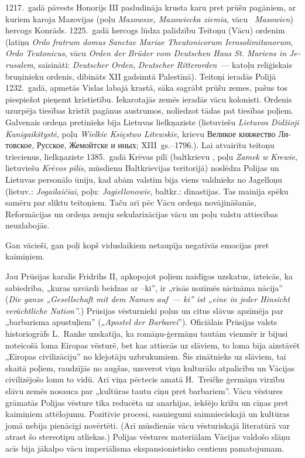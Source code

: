 \documentclass[twoside,a5paper,12pt,fleqn,openany]{extbook}
\newcommand{\pltxti}[1]{\textit{\textpolish{#1}}}
\newcommand{\rutxti}[1]{\textrussian{#1}}
\newcommand{\detxti}[1]{\textit{\textgerman{#1}}}
\newcommand{\lttxti}[1]{\textit{\textlithuanian{#1}}}
\newcommand{\latxti}[1]{\textit{\textlatin{#1}}}
\newcommand{\betxti}[1]{\textbelarusian{#1}}
\begin{document}
1217.~gadā pāvests Honorijs III pasludināja krusta karu pret prūšu pagāniem, ar kuriem karoja Mazovijas (poļu \pltxti{Mazowsze, Mazowiecka ziemia}, vācu ~\detxti{Masowien}) hercogs Konrāds. 1225.~gadā hercogs lūdza palīdzību Teitoņu (Vācu) ordenim (latīņu \latxti{Ordo fratrum domus Sanctae Mariae Theutonicorum Ierosolimitanorum}, \latxti{Ordo Teutonicus}, vācu \detxti{Orden der Brüder vom Deutschen Haus St. Mariens in Jerusalem}, saīsināti: \detxti{Deutscher Orden}, \detxti{Deutscher Ritterorden}~--- katoļu reliģiskais bruņinieku ordenis, dibināts XII gadsimtā Palestīnā). Teitoņi ieradās Polijā 1232.~gadā, apmetās Vislas labajā krastā, sāka sagrābt prūšu zemes, pašus tos piespiežot pieņemt kristietību. Iekarotajās zemēs ieradās vācu kolonisti. Ordenis uzurpēja tiesības kristīt pagānus austrumos, noliedzot tādas pat tiesības poļiem. Galvenais ordeņa pretinieks bija Lietuvas lielkņaziste (lietuviešu \lttxti{Lietuvos Didžioji Kunigaikštystė}, poļu \pltxti{Wielkie Księstwo Litewskie}, krievu \rutxti{Великое княжество Литовское, Русское, Жемойтске и иных}; XIII~gs.--1796.). Lai atvairītu teitoņu triecienus, lielkņaziste 1385.~gadā Krēvas pilī (baltkrievu \betxti{Крэўскі замак}, poļu \pltxti{Zamek w Krewie}, lietuviešu \lttxti{Krėvos pilis}, mūsdienu Baltkrievijas teritorijā) noslēdza Polijas un Lietuvas personālo ūniju, kad abām valstīm bija viens valdnieks no Jagelloņu (lietuv.: \lttxti{Jogailaičiai}, poļu: \pltxti{Jagiellonowie}, baltkr.: \betxti{Ягелоны)} dinastijas. Tas mainīja spēku samēru par sliktu teitoņiem. Taču arī pēc Vācu ordeņa novājināšanās, Reformācijas un ordeņa zemju sekularizācijas vācu un poļu valstu attiecības neuzlabojās.

Gan vācieši, gan poļi kopš viduslaikiem netaupīja negatīvās emocijas pret kaimiņiem.

Jau Prūsijas karalis Fridrihs II, apkopojot poļiem naidīgos uzskatus, izteicās, ka sabiedrība, „kuras uzvārdi beidzas ar --ki”, ir „visās nozīmēs nicināma nācija'' (\detxti{Die ganze „Gesellschaft mit dem Namen auf~--- ki” ist „eine in jeder Hinsicht verächtliche Nation”}.) Prūsijas vēsturnieki poļus un citus slāvus apzīmēja par „barbarisma apustuļiem” („\detxti{Apostel der Barbarei}”). Oficiālais Prūsijas valsts historiogrāfs L.~Ranke uzskatīja, ka romāņu-ģermāņu tautām vienmēr ir bijusi noteicošā loma Eiropas vēsturē, bet kas attiecās uz slāviem, to loma bija aizstāvēt „Eiropas civilizāciju” no klejotāju uzbrukumiem. Šis zinātnieks uz slāviem, tai skaitā poļiem, raudzījās no augšas, uzsverot viņu kulturālo atpalicību un Vācijas civilizējošo lomu to vidū. Arī viņa pēctecis amatā H.~Treičke ģermāņu virzību slāvu zemēs nosauca par „kultūras tautu cīņu pret barbariem”. Vācu vēstures grāmatās Polijas vēsture tika reducēta uz anarhijas, iekšējo krīžu un cīņas pret kaimiņiem attēlojumu. Pozitīvie procesi, sasniegumi saimnieciskajā un kultūras jomā nebija pienācīgi novērtēti. (Arī mūsdienās vācu vēsturiskajā literatūrā var atrast šo stereotipu atliekas.) Polijas vēstures materiālam Vācijas valdošo slāņu acīs bija jākalpo vācu imperiālisma ekspansionistisko centienu pamatojumam.
\end{document}
